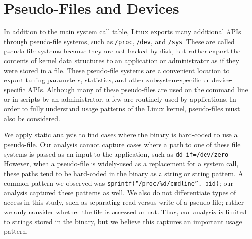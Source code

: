 

\section{Pseudo-Files and Devices}
\label{sec:study:files}

In addition to the main system call table, Linux exports many additional APIs through 
pseudo-file systems, such as {\tt /proc}, {\tt /dev}, and {\tt /sys}.
These are called pseudo-file systems because they are not backed by disk, but
rather export the contents of kernel data structures to an application or administrator
as if they were stored in a file.
These pseudo-file systems are a convenient location to export tuning parameters, statistics, 
and other subsystem-specific or device-specific APIs.
Although many of these pseudo-files are used on the command line or in scripts by an administrator,
a few are routinely used by applications.
In order to fully understand usage patterns of the Linux kernel, pseudo-files must also be considered.

We apply static analysis to find cases where the binary is hard-coded to use a pseudo-file.
Our analysis cannot capture cases where a path to one of these file systems is passed as 
an input to the application, such as {\tt dd if=/dev/zero}.
However, when a pseudo-file is widely-used as a replacement for a system call,
these paths tend to be hard-coded in the binary as a string or string pattern.
A common pattern we observed was {\tt sprintf(``/proc/\%d/cmdline'', pid)}; our analysis captured these patterns as well.
We also do not differentiate types of access in this study, such as separating read
versus write of a pseudo-file; rather we only consider whether the file is accessed or not.
Thus, our analysis is limited to strings stored in the binary, but we believe this captures
an important usage pattern.  %


